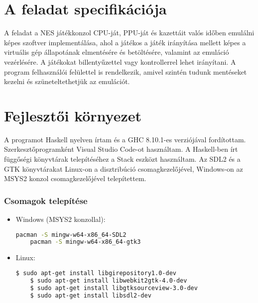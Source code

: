\section{A feladat specifikációja}

A feladat a NES játékkonzol CPU-ját, PPU-ját és kazettáit valós időben emulálni képes szoftver implementálása, ahol a játékos a játék irányítása mellett képes a virtuális gép állapotának elmentésére és betöltésére, valamint az emuláció vezérlésére. A játékokat billentyűzettel vagy kontrollerrel lehet irányítani. A program felhasználói felülettel is rendelkezik, amivel szintén tudunk mentéseket kezelni és szüneteltethetjük az emulációt.

\section{Fejlesztői környezet}

A programot Haskell nyelven írtam és a GHC 8.10.1-es verziójával fordítottam. Szerkesztőprogramként Visual Studio Code-ot használtam. A Haskell-ben írt függőségi könyvtárak telepítéséhez a Stack eszközt használtam.
Az SDL2 és a GTK könyvtárakat Linux-on a disztribúció csomagkezelőjével, Windows-on az MSYS2 konzol csomagkezelőjével telepítettem. 

\subsubsection{Csomagok telepítése}
\begin{itemize}
	\item Windows (MSYS2 konzollal):
	\begin{lstlisting}[language=bash]
	pacman -S mingw-w64-x86_64-SDL2
	pacman -S mingw-w64-x86_64-gtk3
	\end{lstlisting}
	\item Linux:
	\begin{lstlisting}[language=bash]
	$ sudo apt-get install libgirepository1.0-dev
	$ sudo apt-get install libwebkit2gtk-4.0-dev
	$ sudo apt-get install libgtksourceview-3.0-dev
	$ sudo apt-get install libsdl2-dev
	\end{lstlisting}
\end{itemize}

